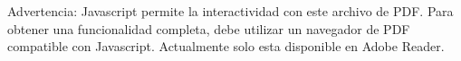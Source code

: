 Advertencia: Javascript permite la interactividad con este archivo de PDF. 
Para obtener una funcionalidad completa, debe utilizar un navegador de PDF 
compatible con Javascript. Actualmente solo esta disponible en Adobe Reader.